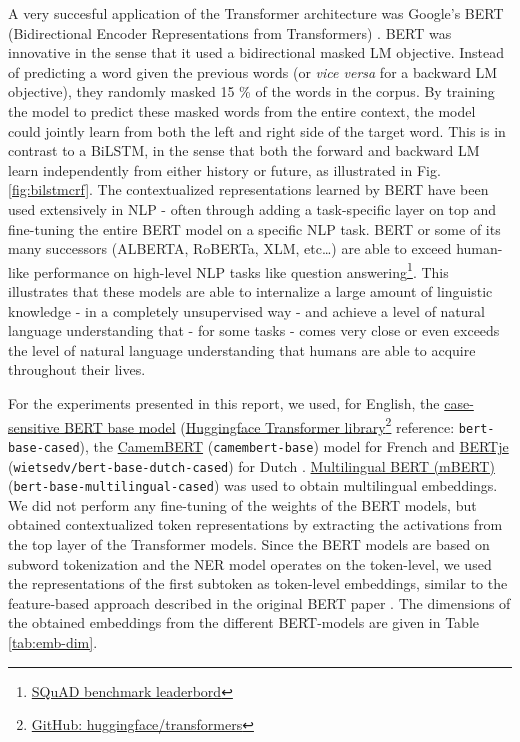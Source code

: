 \documentclass[12pt,a4paper,]{book}
\begin{document}
A very succesful application of the Transformer architecture was Google's BERT (Bidirectional Encoder Representations from Transformers) \citep{devlin2019}. BERT was innovative in the sense that it used a bidirectional masked LM objective. Instead of predicting a word given the previous words (or \emph{vice versa} for a backward LM objective), they randomly masked 15 \% of the words in the corpus. By training the model to predict these masked words from the entire context, the model could jointly learn from both the left and right side of the target word. This is in contrast to a BiLSTM, in the sense that both the forward and backward LM learn independently from either history or future, as illustrated in Fig. \ref{fig:bilstmcrf}. The contextualized representations learned by BERT have been used extensively in NLP - often through adding a task-specific layer on top and fine-tuning the entire BERT model on a specific NLP task. BERT or some of its many successors (ALBERTA, RoBERTa, XLM, etc\ldots{}) are able to exceed human-like performance on high-level NLP tasks like question answering\footnote{\href{https://rajpurkar.github.io/SQuAD-explorer/}{SQuAD benchmark leaderbord}}. This illustrates that these models are able to internalize a large amount of linguistic knowledge - in a completely unsupervised way - and achieve a level of natural language understanding that - for some tasks - comes very close or even exceeds the level of natural language understanding that humans are able to acquire throughout their lives.

For the experiments presented in this report, we used, for English, the \href{https://huggingface.co/bert-base-cased}{case-sensitive BERT base model} (\href{https://github.com/huggingface/transformers}{Huggingface Transformer library}\footnote{\href{https://github.com/huggingface/transformers}{GitHub: huggingface/transformers}} reference: \texttt{bert-base-cased}), the \href{https://huggingface.co/camembert-base}{CamemBERT} (\texttt{camembert-base}) model for French \citep{martin2019} and \href{https://huggingface.co/wietsedv/bert-base-dutch-cased}{BERTje} (\texttt{wietsedv/bert-base-dutch-cased}) for Dutch \citep{devries2019}. \href{https://huggingface.co/bert-base-multilingual-cased}{Multilingual BERT (mBERT)} (\texttt{bert-base-multilingual-cased}) was used to obtain multilingual embeddings. We did not perform any fine-tuning of the weights of the BERT models, but obtained contextualized token representations by extracting the activations from the top layer of the Transformer models. Since the BERT models are based on subword tokenization and the NER model operates on the token-level, we used the representations of the first subtoken as token-level embeddings, similar to the feature-based approach described in the original BERT paper \citep{devlin2019}. The dimensions of the obtained embeddings from the different BERT-models are given in Table \ref{tab:emb-dim}.
\end{document}
